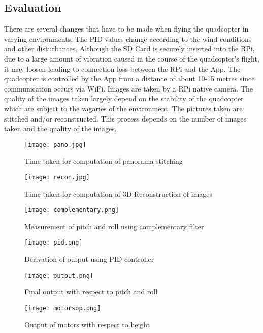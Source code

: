 \subsection{Evaluation}
There are several changes that have to be made when flying the quadcopter in varying environments. The PID values change according to the wind conditions and other disturbances. Although the SD Card is securely inserted into the RPi, due to a large amount of vibration caused in the course of the quadcopter's flight, it may loosen leading to connection loss between the RPi and the App. The quadcopter is controlled by the App from a distance of about 10-15 metres since communication occurs via WiFi. Images are taken by a RPi native camera. The quality of the images taken largely depend on the stability of the quadcopter which are subject to the vagaries of the environment.
The pictures taken are stitched and/or reconstructed. This process depends on the number of images taken and the quality of the images. 
\begin{figure}[H]
  \centering
  \texttt{[image: pano.jpg]}
  \caption{Time taken for computation of panorama stitching}
  \label{panorama stitching time graph}	
\end{figure}


\begin{figure}[H]
  \centering
  \texttt{[image: recon.jpg]}
  \caption{Time taken for computation of 3D Reconstruction of images}
  \label{reconstruction time graph}	
\end{figure}

\begin{figure}[H]
  \centering
  \texttt{[image: complementary.png]}
  \caption{Measurement of pitch and roll using complementary filter}
  \label{Measurement of pitch and roll}	
\end{figure}




\begin{figure}[H]
  \centering
  \texttt{[image: pid.png]}
  \caption{Derivation of output using PID controller}
  \label{Motor output}  
\end{figure}

\begin{figure}[H]
  \centering
  \texttt{[image: output.png]}
  \caption{Final output with respect to pitch and roll}
  \label{Measurement of pitch and roll} 
\end{figure}

\begin{figure}[H]
  \centering
  \texttt{[image: motorsop.png]}
  \caption{Output of motors with respect to height}
  \label{Motor output}	
\end{figure}
